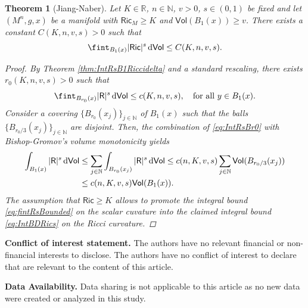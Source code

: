 \documentclass[10pt]{article}
\newtheorem{thm}{Theorem}[section]
\theoremstyle{definition}
\newcommand{\bb}[1]{\mathbb{#1}}
\newcommand{\ssf}[1]{\mathsf{#1}}
\newcommand{\Ric}{\mathsf{Ric}}
\newcommand{\R}{\mathsf{R}}
\newcommand{\de}{{\rm d}}
\begin{document}
\begin{thm}[Jiang-Naber] \label{JiangNaber}
    Let $K \in \bb{R}$, $n \in \bb{N}$, $v>0$, $s \in (0,1)$ be fixed and let $(M^n,g,x)$ be a manifold with $\Ric_M \geq K$ and $\ssf{Vol}(B_1(x)) \geq v$. There exists a constant $C(K,n,v,s)>0$ such that
    \begin{equation}\label{eq:IntBDRics}
    \fint_{B_1(x)} |\Ric|^s \,\de\ssf{Vol} \leq  C(K,n,v,s).
    \end{equation}
    \begin{proof}
    By Theorem \ref{thm:IntRsB1Riccidelta} and a standard rescaling, there exists $r_0(K,n,v,s)>0$ such that  
    \begin{equation}\label{eq:IntRsBr0}
    \fint_{B_{r_0}(x)} |\R|^s \,\de\ssf{Vol} \leq  c(K,n,v,s), \quad \text{for all } y \in B_1(x).
    \end{equation}
    Consider a covering $\{B_{r_0}(x_j)\}_{j \in \bb{N}}$ of $B_1(x)$ such that the balls $\{B_{r_0/3}(x_j)\}_{j \in \bb{N}}$ are disjoint.  
    Then, the combination of \eqref{eq:IntRsBr0} with Bishop-Gromov's volume monotonicity yields
    \begin{align}\label{eq:fintRsBounded}
    \int_{B_1(x)} |\R|^s \, \de \ssf{Vol}& \leq \sum_{j \in \bb{N}} \int_{B_{r_0}(x_j)} |\R|^s \, \de \ssf{Vol}\leq c(n,K,v,s) \sum_{j \in \bb{N}} \ssf{Vol}(B_{r_0/3}(x_j)) \nonumber \\
    & \leq c(n,K,v,s) \ssf{Vol}(B_1(x)).
    \end{align}
    The assumption that $\Ric\geq K$ allows to promote the integral bound \eqref{eq:fintRsBounded} on the scalar cuvature into the claimed  integral bound \eqref{eq:IntBDRics} on the Ricci curvature.
    \end{proof}
\end{thm}


\textbf{Conflict of interest statement.} The authors have no relevant financial or non-financial interests to disclose. The authors
have no conflict of interest to declare that are relevant to the content of this article.
\smallskip


\textbf{Data Availability.} Data sharing is not applicable to this article as no new data were created or analyzed in this study.

\renewcommand*{\bibfont}{\normalfont\small}

\sloppy
\printbibliography
\end{document}
